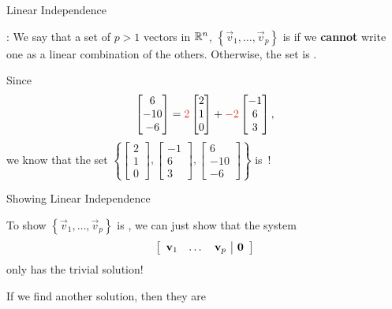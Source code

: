 \documentclass[xcoler=dvipsnames, aspectratio=169]{beamer}
\begin{document}
\begin{frame}{Linear Independence}
    \begin{defn}
        : We say that a set of $p>1$ vectors in $\R^n$, 
        $\left\{\vec{v}_1,\dots,\vec{v}_p\right\}$ is  if we \textbf{cannot} 
        write one as a linear combination of the others. Otherwise, the set is .
    \end{defn}
    \begin{example}
        Since 
        \[
            \begin{bmatrix}6\\-10\\-6\end{bmatrix} = \rText{2}\begin{bmatrix}2\\1\\0\end{bmatrix}
                + \rText{-2}\begin{bmatrix}-1\\6\\3\end{bmatrix},
        \]
        we know that the set $\left\{\begin{bmatrix}2\\1\\0\end{bmatrix},
            \begin{bmatrix}-1\\6\\3\end{bmatrix},\begin{bmatrix}6\\-10\\-6\end{bmatrix}\right\}$ is\pause\ 
                !
    \end{example}
\end{frame}
\begin{frame}{Showing Linear Independence}
    \begin{theorem}
        To show $\left\{\vec{v}_1,\dots,\vec{v}_p\right\}$ is , we can
        just show that the system\pause
        \[
            \aMat{ccc|c}{
                \vec{v}_1 & \dots & \vec{v}_p & \vec{0}
            }
        \]
        \pause
        only has the trivial solution!
    \end{theorem}
    \vspace{60pt}\pause
    \begin{tcolorbox}
        If we find another solution, then they are 
    \end{tcolorbox}
\end{frame}
\end{document}
